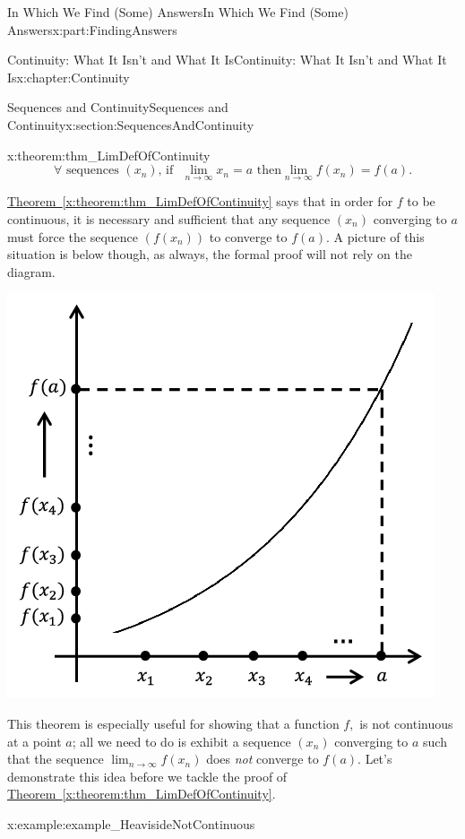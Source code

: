 \documentclass[oneside,10pt,]{book}
\newcommand{\xreffont}{\relax}
\numberwithin{equation}{section}
\begin{document}
\begin{partptx}{In Which We Find (Some) Answers}{}{In Which We Find (Some) Answers}{}{}{x:part:FindingAnswers}
\begin{chapterptx}{Continuity: What It Isn't and What It Is}{}{Continuity: What It Isn't and What It Is}{}{}{x:chapter:Continuity}
\begin{sectionptx}{Sequences and Continuity}{}{Sequences and Continuity}{}{}{x:section:SequencesAndContinuity}
\begin{theorem}{}{}{x:theorem:thm_LimDefOfContinuity}
\begin{equation*}
\forall\text{ sequences } \left(x_n\right)\text{, if } \,\,\lim_{n\rightarrow\infty}x_n=a \text{ then} \lim_{n\rightarrow\infty}f(x_n)=f(a).{}
\end{equation*}
%
\end{theorem}
\hyperref[x:theorem:thm_LimDefOfContinuity]{Theorem~{\xreffont\ref{x:theorem:thm_LimDefOfContinuity}}} says that in order for \(f\) to be continuous, it is necessary and sufficient that any sequence \(\left(x_n\right)\) converging to \(a\) must force the sequence \(\left(f(x_n)\right)\) to converge to \(f(a)\).  A picture of this situation is below though, as always, the formal proof will not rely on the diagram.%
\begin{image}{0.315}{0.37}{0.315}%
\includegraphics[width=\linewidth]{images/Ch5fig6.png}
\end{image}%
This theorem is especially useful for showing that a function \(f,\) is not continuous at a point \(a\); all we need to do is exhibit a sequence \(\left(x_n\right)\) converging to \(a\) such that the sequence \(\lim_{n\rightarrow\infty}f(x_n)\) does \emph{not} converge to \(f(a)\).  Let's demonstrate this idea before we tackle the proof of \hyperref[x:theorem:thm_LimDefOfContinuity]{Theorem~{\xreffont\ref{x:theorem:thm_LimDefOfContinuity}}}.%
\begin{example}{}{x:example:example_HeavisideNotContinuous}%

\end{example}
\end{sectionptx}
\end{chapterptx}
\end{partptx}
\end{document}
